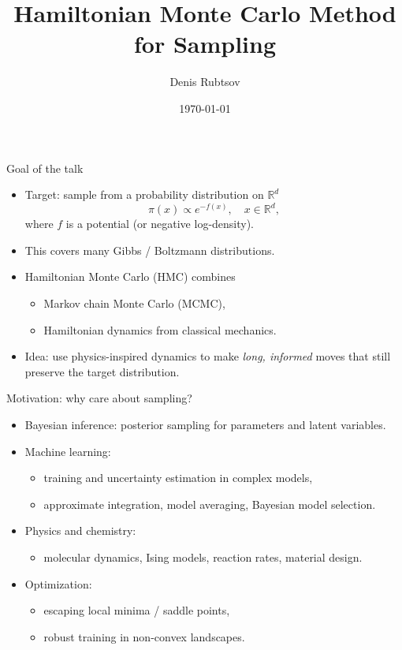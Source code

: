 \documentclass{beamer}
\title[Hamiltonian Monte Carlo]{Hamiltonian Monte Carlo Method for Sampling}
\author{Denis Rubtsov}
\institute{MIPT, Intelligence Systems Department}
\date{\today}
\begin{document}
\begin{frame}
  \titlepage
\end{frame}

\begin{frame}{Goal of the talk}
  \begin{itemize}
    \item Target: sample from a probability distribution on $\mathbb{R}^d$
    \[
      \pi(x) \propto e^{-f(x)}, \quad x \in \mathbb{R}^d,
    \]
    where $f$ is a potential (or negative log-density).
    \item This covers many Gibbs / Boltzmann distributions.
    \item Hamiltonian Monte Carlo (HMC) combines
      \begin{itemize}
        \item Markov chain Monte Carlo (MCMC),
        \item Hamiltonian dynamics from classical mechanics.
      \end{itemize}
    \item Idea: use physics-inspired dynamics to make \emph{long, informed} moves
          that still preserve the target distribution.
  \end{itemize}
\end{frame}

\begin{frame}{Motivation: why care about sampling?}
  \begin{itemize}
    \item Bayesian inference: posterior sampling for parameters and latent variables.
    \item Machine learning:
      \begin{itemize}
        \item training and uncertainty estimation in complex models,
        \item approximate integration, model averaging, Bayesian model selection.
      \end{itemize}
    \item Physics and chemistry:
      \begin{itemize}
        \item molecular dynamics, Ising models, reaction rates, material design.
      \end{itemize}
    \item Optimization:
      \begin{itemize}
        \item escaping local minima / saddle points,
        \item robust training in non-convex landscapes.
      \end{itemize}
  \end{itemize}
\end{frame}
\end{document}
